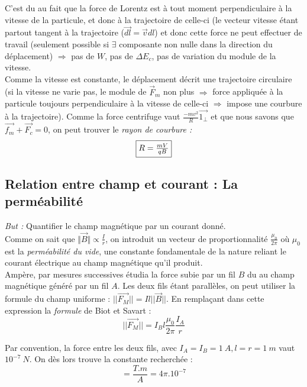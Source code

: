 \documentclass	[11pt, a4paper, openany]{book}
\begin{document}
C'est du au fait que la force de Lorentz est à tout moment perpendiculaire à la vitesse de la particule, et donc à la trajectoire de celle-ci (le vecteur vitesse étant partout tangent à la trajectoire ($\vec{dl} = \vec{v}dl$) et donc cette force ne peut effectuer de travail (seulement possible si $\exists$ composante non nulle dans la direction du déplacement) $\Rightarrow$ pas de $W$, pas de $\Delta E_c$, pas de variation du module de la vitesse.\\


Comme la vitesse est constante, le déplacement décrit une trajectoire circulaire (si la vitesse ne varie pas, le module de $\vec{F}_m$ non plus $\Rightarrow$ force appliquée à la particule toujours perpendiculaire à la vitesse de celle-ci $\Rightarrow$ impose une courbure à la trajectoire). Comme la force centrifuge vaut $\frac{-mv^2}{R}\vec{1_\perp}$ et que nous savons que $\vec{f_m} + \vec{F_c} = 0$, on peut trouver le \textit{rayon de courbure :}
\begin{equation}
\fbox{$R = \frac{mV}{qB}$} 
\end{equation}


\subsection{Relation entre champ et courant : La perméabilité}
\textit{But :} Quantifier le champ magnétique par un courant donné.\\
Comme on sait que $\Vert \vec{B} \Vert \propto \frac{I}{r}$, on introduit un vecteur de proportionnalité $\frac{\mu_0}{2\pi}$ où $\mu_0$ est la \textit{perméabilité du vide}, une constante fondamentale de la nature reliant le courant électrique au champ magnétique qu'il produit.\\

Ampère, par mesures successives étudia la force subie par un fil $B$ du au champ magnétique généré par un fil $A$. Les deux fils étant parallèles, on peut utiliser la formule du champ uniforme : $||\vec{F_M}|| = I l ||\vec{B}||$. En remplaçant dans cette expression la \textit{formule} de Biot et Savart :
\begin{equation}
||\vec{F_M}|| = I_Bl\frac{\mu_0}{2\pi}\frac{I_A}{r}
\end{equation}




Par convention, la force entre les deux fils, avec $I_A = I_B = 1\ A, l = r = 1\ m$ vaut $10^{-7}\ N$. On dès lors trouve la constante recherchée :
\begin{equation}
[\mu_0] = \frac{T.m}{A} = 4\pi . 10^{-7}
\end{equation}
\end{document}
